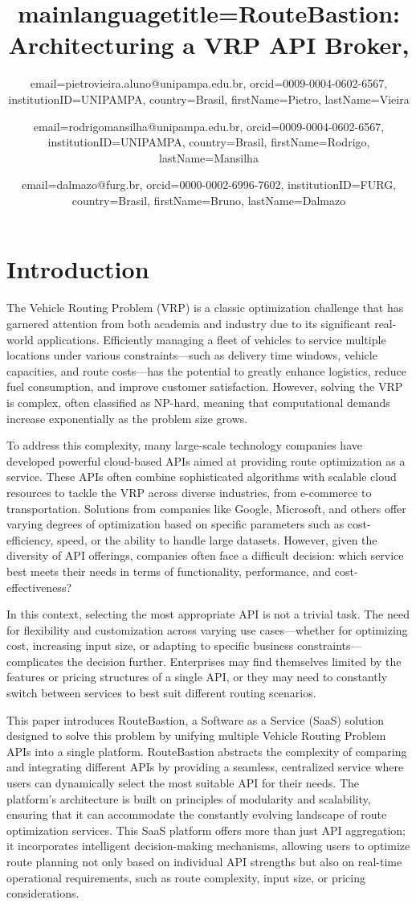 \documentclass[english,notblind]{sbc20}
\title
  {
    mainlanguagetitle={RouteBastion: Architecturing a VRP API Broker},
  }
\author
  {
    email=pietrovieira.aluno@unipampa.edu.br,
    orcid=0009-0004-0602-6567,
    institutionID=UNIPAMPA,
    country=Brasil,
    firstName=Pietro,
    lastName=Vieira 
  }
\author
  {
    email=rodrigomansilha@unipampa.edu.br,
    orcid=0009-0004-0602-6567, %
    institutionID=UNIPAMPA,
    country=Brasil,
    firstName=Rodrigo,
    lastName=Mansilha 
  }
\author
  {
    email=dalmazo@furg.br,
    orcid=0000-0002-6996-7602,
    institutionID=FURG,
    country=Brasil,
    firstName=Bruno,
    lastName=Dalmazo 
  }
\begin{document}
\maketitle

\section{Introduction}
\label{sec:intro}

The Vehicle Routing Problem (VRP) is a classic optimization challenge that has garnered attention from both academia and industry due to its significant real-world applications. Efficiently managing a fleet of vehicles to service multiple locations under various constraints—such as delivery time windows, vehicle capacities, and route costs—has the potential to greatly enhance logistics, reduce fuel consumption, and improve customer satisfaction. However, solving the VRP is complex, often classified as NP-hard, meaning that computational demands increase exponentially as the problem size grows.

To address this complexity, many large-scale technology companies have developed powerful cloud-based APIs aimed at providing route optimization as a service. These APIs often combine sophisticated algorithms with scalable cloud resources to tackle the VRP across diverse industries, from e-commerce to transportation. Solutions from companies like Google, Microsoft, and others offer varying degrees of optimization based on specific parameters such as cost-efficiency, speed, or the ability to handle large datasets. However, given the diversity of API offerings, companies often face a difficult decision: which service best meets their needs in terms of functionality, performance, and cost-effectiveness?

In this context, selecting the most appropriate API is not a trivial task. The need for flexibility and customization across varying use cases—whether for optimizing cost, increasing input size, or adapting to specific business constraints—complicates the decision further. Enterprises may find themselves limited by the features or pricing structures of a single API, or they may need to constantly switch between services to best suit different routing scenarios.

This paper introduces RouteBastion, a Software as a Service (SaaS) solution designed to solve this problem by unifying multiple Vehicle Routing Problem APIs into a single platform. RouteBastion abstracts the complexity of comparing and integrating different APIs by providing a seamless, centralized service where users can dynamically select the most suitable API for their needs. The platform’s architecture is built on principles of modularity and scalability, ensuring that it can accommodate the constantly evolving landscape of route optimization services. This SaaS platform offers more than just API aggregation; it incorporates intelligent decision-making mechanisms, allowing users to optimize route planning not only based on individual API strengths but also on real-time operational requirements, such as route complexity, input size, or pricing considerations.
\end{document}
